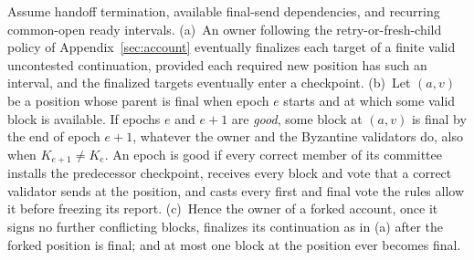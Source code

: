 \documentclass[conference]{IEEEtran}
\begin{document}
\begin{theorem}
\label{thm:account-live}
Assume handoff termination, available final-send dependencies, and recurring common-open ready intervals.
(a)~An owner following the retry-or-fresh-child policy of Appendix~\ref{sec:account} eventually finalizes each target of a finite valid uncontested continuation, provided each required new position has such an interval, and the finalized targets eventually enter a checkpoint.
(b)~Let $(a,v)$ be a position whose parent is final when epoch $e$ starts and at which some valid block is available. If epochs $e$ and $e+1$ are \emph{good}, some block at $(a,v)$ is final by the end of epoch $e+1$, whatever the owner and the Byzantine validators do, also when $K_{e+1}\ne K_e$. An epoch is good if every correct member of its committee installs the predecessor checkpoint, receives every block and vote that a correct validator sends at the position, and casts every first and final vote the rules allow it before freezing its report.
(c)~Hence the owner of a forked account, once it signs no further conflicting blocks, finalizes its continuation as in (a) after the forked position is final; and at most one block at the position ever becomes final.
\end{theorem}
\end{document}

